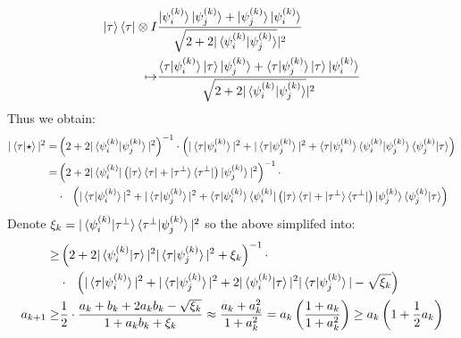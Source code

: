 \documentclass[manuscript,screen,review]{acmart}
\begin{document}
\begin{equation*}
  \begin{split}
    \ket{\tau}\bra{\tau} \otimes I & \frac{ \ket{\psi^{(k)}_{i}}\ket{\psi^{(k)}_{j}}+\ket{\psi^{(k)}_{j}}\ket{\psi^{(k)}_{i}} }{ \sqrt{2 + 2 |\braket{\psi^{(k)}_{i}|\psi^{(k)}_{j}}}|^2 } \\ 
    \mapsto &  \frac{ \braket{\tau|\psi^{(k)}_{i}}\ket{\tau}\ket{\psi^{(k)}_{j}}+\braket{\tau|\psi^{(k)}_{j}}\ket{\tau}\ket{\psi^{(k)}_{i}} }{ \sqrt{2 + 2 |\braket{\psi^{(k)}_{i}|\psi^{(k)}_{j}}}|^2 }
  \end{split}
\end{equation*}
Thus we obtain: 
\begin{equation*}
  \begin{split}
    | \braket{\tau|\star}|^{2}  = & \left(2 + 2 |\braket{\psi^{(k)}_{i}|\psi^{(k)}_{j}}|^2\right)^{-1} \cdot \left( | \braket{\tau|\psi^{(k)}_{i}}|^{2} + | \braket{\tau|\psi^{(k)}_{j}}|^{2}  + \braket{\tau|\psi^{(k)}_{i}}\braket{\psi^{(k)}_{i}|\psi^{(k)}_{j}}\braket{\psi^{(k)}_{j}|\tau}\right) \\
    = & \left(2 + 2 |\bra{\psi^{(k)}_{i}}\left( \ket{\tau}\bra{\tau}+ \ket{\tau^{\perp}}\bra{\tau^{\perp}} \right)\ket{\psi^{(k)}_{j}}|^2\right)^{-1} \cdot \\
    & \cdot \ \ \left( | \braket{\tau|\psi^{(k)}_{i}}|^{2} + | \braket{\tau|\psi^{(k)}_{j}}|^{2}  + \braket{\tau|\psi^{(k)}_{i}}\bra{\psi^{(k)}_{i}}\left( \ket{\tau}\bra{\tau}+ \ket{\tau^{\perp}}\bra{\tau^{\perp}} \right)\ket{\psi^{(k)}_{j}}\braket{\psi^{(k)}_{j}|\tau}\right) \\
  \end{split}
\end{equation*}
Denote $\xi_{k} = |\braket{\psi^{(k)}_{i}|\tau^{\perp}}\braket{\tau^{\perp}|\psi^{(k)}_{j}}|^2$ so the above simplifed into:
\begin{equation*}
  \begin{split}
    \ge & \left(2 + 2 |\braket{\psi^{(k)}_{i}|\tau}|^2|\braket{\tau|\psi^{(k)}_{j}}|^2 + \xi_{k}\right)^{-1} \cdot \\
    & \cdot \ \ \left( | \braket{\tau|\psi^{(k)}_{i}}|^{2} + | \braket{\tau|\psi^{(k)}_{j}}|^{2}  + 2 |\braket{\psi^{(k)}_{i}|\tau}|^2|\braket{\tau|\psi^{(k)}_{j}}| - \sqrt{\xi_{k}}\right) \\
    a_{k+1} \ge &  \frac{1}{2}\cdot \frac{a_{k}+b_{k}+2a_{k}b_{k} - \sqrt{\xi_{k}}}{1 + a_{k}b_{k} + \xi_{k}} \approx \frac{a_{k}+a_{k}^{2}}{1 + a_{k}^{2}} = a_{k}\left( \frac{1 + a_{k}}{1 + a_{k}^{2}} \right) \ge a_{k}\left( 1 + \frac{1}{2}a_{k} \right) 
  \end{split}
\end{equation*}
\end{document}
